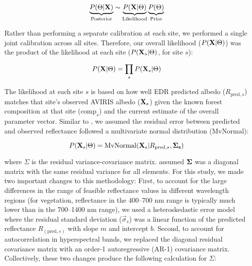 \begin{equation}
  \underbrace{P(\relax{\Theta} | \mathbf{X})}_{\text{Posterior}} \sim \underbrace{P(\mathbf{X} | \relax{\Theta})}_{\text{Likelihood}} \underbrace{P(\relax{\Theta})}_{\text{Prior}}
\end{equation}

Rather than performing a separate calibration at each site, we performed a single joint calibration across all sites.
Therefore, our overall likelihood ($P(\mathbf{X} | \relax{\Theta})$) was the product of the likelihood at each site ($P(\mathbf{X}_{s} | \relax{\Theta})$, for site $s$):

\begin{equation}
  P(\mathbf{X} | \relax{\Theta}) = \prod_{s} P(\mathbf{X}_{s} | \relax{\Theta})
\end{equation}

The likelihood at each site $s$ is based on how well EDR predicted albedo ($R_{\mathrm{pred}, s}$) matches that site's observed AVIRIS albedo ($\mathbf{X}_{s}$)
given the known forest composition at that site ($\mathrm{comp}_{s}$) and the current estimate of the overall parameter vector.
Similar to \citet{shiklomanov2016quantifying}, we assumed the residual error between predicted and observed reflectance followed a multivariate normal distribution ($\mathrm{MvNormal}$):

\begin{equation}
  P(\mathbf{X}_{s} | \relax{\Theta}) =
  \mathrm{MvNormal}(\mathbf{X}_{s} | R_{\mathrm{pred}, s}, \mathbf{\Sigma_{s}})
\end{equation}

where $\Sigma$ is the residual variance-covariance matrix.
\citet{shiklomanov2016quantifying} assumed $\mathbf{\Sigma}$ was a diagonal matrix with the same residual variance for all elements.
For this study, we made two important changes to this methodology:
First, to account for the large differences in the range of feasible reflectance values in different wavelength regions
(for vegetation, reflectance in the 400--700 \unit{nm} range is typically much lower than in the 700--1400 \unit{nm} range),
we used a heteroskedastic error model where the residual standard deviation ($\vec{\sigma}_{s}$) was a linear function of the predicted reflectance $R_{(\mathrm{pred}, s)}$ with slope $m$ and intercept $b$.
Second, to account for autocorrelation in hyperspectral bands, we replaced the diagonal residual covariance matrix with an order-1 autoregressive (AR-1) covariance matrix.
Collectively, these two changes produce the following calculation for $\Sigma$:

